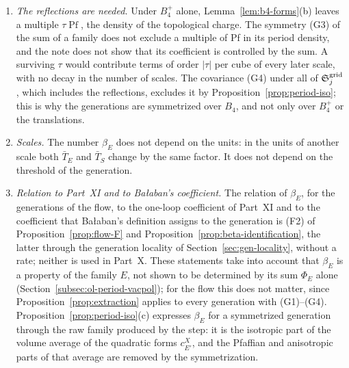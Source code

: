 \begin{remark}\label{rem:period-density}
\begin{enumerate}[label=(\alph*)]
\item \emph{The reflections are needed.} Under $B_4^+$ alone, Lemma~\ref{lem:b4-forms}(b) leaves a multiple $\tau\operatorname{Pf}$, the density of the topological charge. The symmetry (G3) of the sum of a family does not exclude a multiple of Pf in its period density, and the note does not show that its coefficient is controlled by the sum. A surviving $\tau$ would contribute terms of order $|\tau|$ per cube of every later scale, with no decay in the number of scales. The covariance (G4) under all of $\mathfrak S^{\rm grid}_j$, which includes the reflections, excludes it by Proposition~\ref{prop:period-iso}; this is why the generations are symmetrized over $B_4$, and not only over $B_4^+$ or the translations.
\item \emph{Scales.} The number $\beta_E$ does not depend on the units: in the units of another scale both $\bar T_E$ and $\bar T_S$ change by the same factor. It does not depend on the threshold of the generation.
\item \emph{Relation to Part~XI and to Ba\l aban's coefficient.} The relation of $\beta_E$, for the generations of the flow, to the one-loop coefficient of Part~XI and to the coefficient that Ba\l aban's definition \cite[(1.20)--(1.22)]{BalYM4I} assigns to the generation is (F2) of Proposition~\ref{prop:flow-F} and Proposition~\ref{prop:beta-identification}, the latter through the generation locality of Section~\ref{sec:gen-locality}, without a rate; neither is used in Part~X. These statements take into account that $\beta_E$ is a property of the family $E$, not shown to be determined by its sum $\Phi_E$ alone (Section~\ref{subsec:ol-period-vacpol}); for the flow this does not matter, since Proposition~\ref{prop:extraction} applies to every generation with (G1)--(G4). Proposition~\ref{prop:period-iso}(c) expresses $\beta_E$ for a symmetrized generation through the raw family produced by the step: it is the isotropic part of the volume average of the quadratic forms $c^X_{E'}$, and the Pfaffian and anisotropic parts of that average are removed by the symmetrization.
\end{enumerate}
\end{remark}
